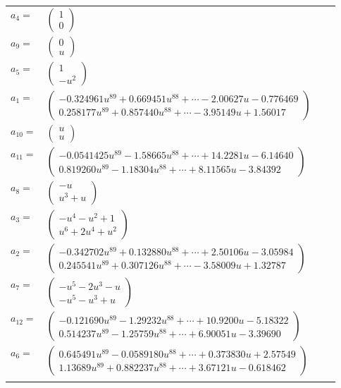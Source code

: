 \documentclass[1p]{elsarticle_modified}
\theoremstyle{definition}
\begin{document}
\begin{tabular}{m{7pt} m{180pt} m{7pt} m{180pt} }
\flushright $a_{4}=$&$\begin{pmatrix}1\\0\end{pmatrix}$ \\
\flushright $a_{9}=$&$\begin{pmatrix}0\\u\end{pmatrix}$ \\
\flushright $a_{5}=$&$\begin{pmatrix}1\\- u^2\end{pmatrix}$ \\
\flushright $a_{1}=$&$\begin{pmatrix}-0.324961 u^{89}+0.669451 u^{88}+\cdots-2.00627 u-0.776469\\0.258177 u^{89}+0.857440 u^{88}+\cdots-3.95149 u+1.56017\end{pmatrix}$ \\
\flushright $a_{10}=$&$\begin{pmatrix}u\\u\end{pmatrix}$ \\
\flushright $a_{11}=$&$\begin{pmatrix}-0.0541425 u^{89}-1.58665 u^{88}+\cdots+14.2281 u-6.14640\\0.819260 u^{89}-1.18304 u^{88}+\cdots+8.11565 u-3.84392\end{pmatrix}$ \\
\flushright $a_{8}=$&$\begin{pmatrix}- u\\u^3+u\end{pmatrix}$ \\
\flushright $a_{3}=$&$\begin{pmatrix}- u^4- u^2+1\\u^6+2 u^4+u^2\end{pmatrix}$ \\
\flushright $a_{2}=$&$\begin{pmatrix}-0.342702 u^{89}+0.132880 u^{88}+\cdots+2.50106 u-3.05984\\0.245541 u^{89}+0.307126 u^{88}+\cdots-3.58009 u+1.32787\end{pmatrix}$ \\
\flushright $a_{7}=$&$\begin{pmatrix}- u^5-2 u^3- u\\- u^5- u^3+u\end{pmatrix}$ \\
\flushright $a_{12}=$&$\begin{pmatrix}-0.121690 u^{89}-1.29232 u^{88}+\cdots+10.9200 u-5.18322\\0.514237 u^{89}-1.25759 u^{88}+\cdots+6.90051 u-3.39690\end{pmatrix}$ \\
\flushright $a_{6}=$&$\begin{pmatrix}0.645491 u^{89}-0.0589180 u^{88}+\cdots+0.373830 u+2.57549\\1.13689 u^{89}+0.882237 u^{88}+\cdots+3.67121 u-0.618462\end{pmatrix}$\\&\end{tabular}
\end{document}

